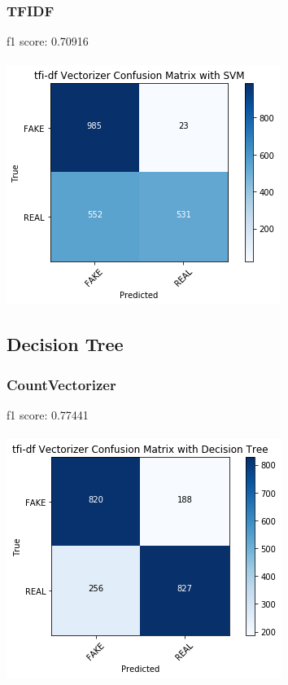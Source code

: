 \documentclass[twoside,twocolumn]{article}
\begin{document}
    \subsubsection{TFIDF}
    f1 score: 0.70916\\
    \\ \noindent \includegraphics[scale=0.6]{figures/SVM_tfidf.png}
    
    \subsection{Decision Tree}
    \subsubsection{CountVectorizer}
    f1 score: 0.77441\\
    \\ \noindent \includegraphics[scale=0.6]{figures/tree_count.png}
\end{document}
